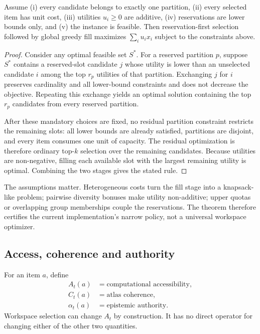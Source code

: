 \begin{theorem}
Assume (i) every candidate belongs to exactly one partition, (ii) every selected item has unit cost, (iii) utilities \(u_i\ge0\) are additive, (iv) reservations are lower bounds only, and (v) the instance is feasible. Then reservation-first selection followed by global greedy fill maximizes \(\sum_i u_i x_i\) subject to the constraints above.
\end{theorem}

\begin{proof}
Consider any optimal feasible set \(S^*\). For a reserved partition \(p\), suppose \(S^*\) contains a reserved-slot candidate \(j\) whose utility is lower than an unselected candidate \(i\) among the top \(r_p\) utilities of that partition. Exchanging \(j\) for \(i\) preserves cardinality and all lower-bound constraints and does not decrease the objective. Repeating this exchange yields an optimal solution containing the top \(r_p\) candidates from every reserved partition.

After these mandatory choices are fixed, no residual partition constraint restricts the remaining slots: all lower bounds are already satisfied, partitions are disjoint, and every item consumes one unit of capacity. The residual optimization is therefore ordinary top-$k$ selection over the remaining candidates. Because utilities are non-negative, filling each available slot with the largest remaining utility is optimal. Combining the two stages gives the stated rule.
\end{proof}

The assumptions matter. Heterogeneous costs turn the fill stage into a knapsack-like problem; pairwise diversity bonuses make utility non-additive; upper quotas or overlapping group memberships couple the reservations. The theorem therefore certifies the current implementation's narrow policy, not a universal workspace optimizer.

\subsection{Access, coherence and authority}

For an item \(a\), define
\[
\begin{aligned}
A_t(a)&=\text{computational accessibility},\\
C_t(a)&=\text{atlas coherence},\\
\alpha_t(a)&=\text{epistemic authority}.
\end{aligned}
\]
Workspace selection can change \(A_t\) by construction. It has no direct operator for changing either of the other two quantities.


